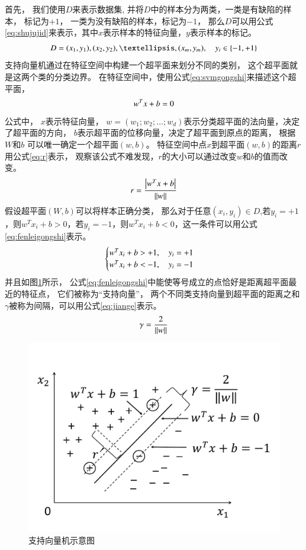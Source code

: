 首先，
我们使用$D$来表示数据集,
并将$D$中的样本分为两类，一类是有缺陷的样本，
标记为$+1$，
一类为没有缺陷的样本，标记为$-1$，
那么$D$可以用公式\eqref{eq:shujujid}来表示，其中$x$表示样本的特征向量，$y$表示样本的标记。
\begin{equation}
\centering
D={(x_1,y_1), 
(x_2,y_2),…,(x_m,y_m)},\quad y_i\in \{-1,+1\}
\label{eq:shujujid}
\end{equation}
支持向量机通过在特征空间中构建一个超平面来划分不同的类别，
这个超平面就是这两个类的分类边界。
在特征空间中，使用公式\eqref{eq:svmgongshi}来描述这个超平面，
\begin{equation}
\centering
w^Tx+b=0
\label{eq:svmgongshi}
\end{equation}
公式中，
$x$表示特征向量，
$w=(w_1;w_2;…;w_d)$表示分类超平面的法向量，决定了超平面的方向，
$b$表示超平面的位移向量，决定了超平面到原点的距离，
根据$W$和$b$
可以唯一确定一个超平面$(w,b)$。
特征空间中点$x$到超平面$(w,b)$的距离$r$用公式\eqref{eq:r}表示，
观察该公式不难发现，$r$的大小可以通过改变$w$和$b$的值而改变。
\begin{equation}
\centering
r=\frac{\left| w^Tx+b\right|}{\lVert w\rVert}
\label{eq:r}
\end{equation}
假设超平面$(W,b)$可以将样本正确分类，
那么对于任意$(x_i,y_i)\in D$,若$y_i=+1$，则$w^T x_i+b>0$，若$y_i=-1$，则$w^T x_i+b<0$，这一条件可以用公式\eqref{eq:fenleigongshi}表示。
\begin{equation}
\centering
\begin{cases}
w^Tx_i+b>+1 ,\quad y_i=+1\\
w^Tx_i+b<-1 ,\quad y_i=-1
\end{cases}
\label{eq:fenleigongshi}
\end{equation}
并且如图\ref{fig:svm}所示，
公式\eqref{eq:fenleigongshi}中能使等号成立的点恰好是距离超平面最近的特征点，
它们被称为“支持向量”，
两个不同类支持向量到超平面的距离之和$\gamma$被称为间隔，可以用公式\eqref{eq:jiange}表示。
\begin{equation}
\centering
\gamma = \frac{2}{ \lVert w\rVert }
\label{eq:jiange}
\end{equation}
\begin{figure}[htbp]
\centering
\includegraphics[width=0.7\linewidth]{figures/svm.pdf}
\caption{支持向量机示意图}
\label{fig:svm}
\end{figure}
